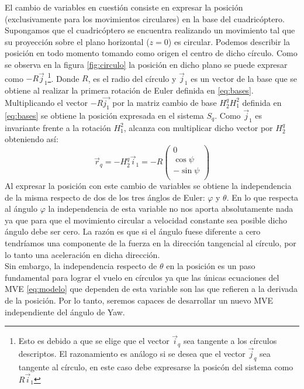 \documentclass[main]{subfiles}
\begin{document}
El cambio de variables en cuesti\'on consiste en expresar la posici\'on (exclusivamente para los movimientos circulares) en la base del cuadric\'optero. Supongamos que el cuadric\'optero se encuentra realizando un movimiento tal que su proyecci\'on sobre el plano horizontal ($z=0$) es circular. Podemos describir la posici\'on en todo momento tomando como origen el centro de dicho c\'irculo. Como se observa en la figura \ref{fig:circulo} la posici\'on en dicho plano se puede expresar como $-R\vec{j}_1$\footnote{Esto es debido a que se elige que el vector $\vec{i}_q$ sea tangente a los c\'irculos descriptos. El razonamiento es an\'alogo si se desea que el vector $\vec{j}_q$ sea tangente al c\'irculo, en este caso debe expresarse la posic\'on del sistema como $R\vec{i}_1$}. Donde $R$, es el radio del c\'irculo y $\vec{j}_1$ es un vector de la base que se obtiene al realizar la primera rotaci\'on de Euler definida en \ref{eq:bases}. Multiplicando el vector $-R\vec{j_1}$ por la matriz cambio de base $H_2^qH_1^2$ definida en \ref{eq:bases} se obtiene la posici\'on expresada en el sistema $S_q$. Como $\vec{j}_1$ es invariante frente a la rotaci\'on $H_1^2$, alcanza con multiplicar dicho vector por $H_2^q$ obteniendo as\'i:
\begin{equation}
\label{eq:pos_circ}
\vec{r}_q=-H_2^q\vec{i}_1=-R\left(\begin{array}{c}
0\\
\cos\psi\\
-\sin\psi\\
\end{array}\right)
\end{equation}
Al expresar la posici\'on con este cambio de variables se obtiene la independencia de la misma respecto de dos de los tres \'anglos de Euler: $\varphi$ y $\theta$. En lo que respecta al \'angulo $\varphi$ la independencia de esta variable no nos aporta absolutamente nada ya que para que el movimiento circular a velocidad constante sea posible dicho \'angulo debe ser cero. La raz\'on es que si el \'angulo fuese diferente a cero tendr\'iamos una componente de la fuerza en la direcci\'on tangencial al c\'irculo, por lo tanto una aceleraci\'on en dicha direcci\'on.\\

Sin embargo, la independencia respecto de $\theta$ en la posici\'on es un paso fundamental para lograr el vuelo en c\'irculos ya que las \'unicas ecuaciones del MVE \ref{eq:modelo} que dependen de esta variable son las que refieren a la derivada de la posici\'on. Por lo tanto, seremos capaces de desarrollar un nuevo MVE independiente del \'angulo de Yaw.\\
\end{document}
